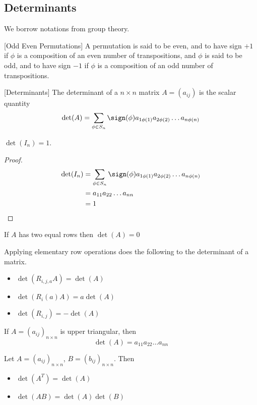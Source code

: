 \subsection{Determinants}
We borrow notations from group theory. 
\begin{defn}{}{}[Odd Even Permutations] A permutation is said to be even, and to have sign $+1$ if $\phi$ is a composition of an even number of transpositions, and $\phi$ is said to be odd, and to have sign $-1$ if $\phi$ is a composition of an odd number of transpositions. 
\end{defn}

\begin{defn}{}{}[Determinants] The determinant of a $n\times n$ matrix $A=(a_{ij})$ is the scalar quantity $$\det(A)=\sum_{\phi\in S_n}\sign(\phi)a_{1\phi(1)}a_{2\phi(2)}\dots a_{n\phi(n)}$$
\end{defn}

\begin{lmm}{}{} $\det(I_n)=1$. 
\end{lmm}
\begin{proof} 
\begin{align*}
\det(I_n)&=\sum_{\phi\in S_n}\sign(\phi)a_{1\phi(1)}a_{2\phi(2)}\dots a_{n\phi(n)}\\
&=a_{11}a_{22}\dots a_{nn}\\
&=1
\end{align*}
\end{proof}

\begin{prp}{}{} If $A$ has two equal rows then $\det(A)=0$
\end{prp}

\begin{prp}{}{} Applying elementary row operations does the following to the determinant of a matrix. 
\begin{itemize}
\item $\det(R_{i,j,a}A)=\det(A)$
\item $\det(R_{i}(a)A)=a\det(A)$
\item $\det(R_{i,j})=-\det(A)$
\end{itemize}
\end{prp}

\begin{prp}{}{} If $A=(a_{ij})_{n\times n}$ is upper triangular, then $$\det(A)=a_{11}a_{22}\dots a_{nn}$$
\end{prp}

\begin{prp}{}{} Let $A=(a_{ij})_{n\times n}$, $B=(b_{ij})_{n\times n}$. Then 
\begin{itemize}
\item $\det(A^T)=\det(A)$
\item $\det(AB)=\det(A)\det(B)$
\end{itemize}
\end{prp}

